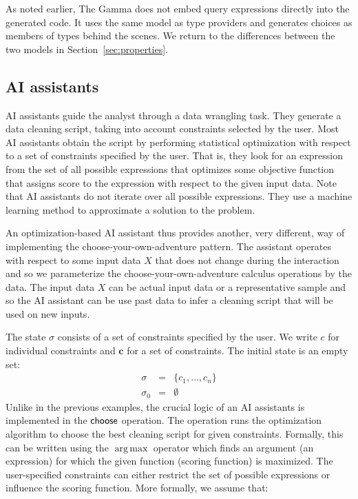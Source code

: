 \documentclass[a4paper,UKenglish,cleveref, autoref, thm-restate]{lipics-v2021}
\newcommand{\ident}[1]{\textsf{#1}}
\newcommand{\sigmaN}{\sigma_0}
\newcommand{\select}{\textnormal{\ident{choose}}}
\DeclareMathOperator{\argmax}{arg\,max}
\begin{document}
As noted earlier, The Gamma does not embed query expressions directly into the generated code.
It uses the same model as type providers and generates choices as members of
types behind the scenes. We return to the differences between the two models in
Section~\ref{sec:properties}.

\subsection{AI assistants}
AI assistants guide the analyst through a data wrangling task. They
generate a data cleaning script, taking into account constraints selected by the user.
Most AI assistants obtain the script by performing statistical optimization with respect
to a set of constraints specified by the user. That is, they look for an expression from the
set of all possible expressions that optimizes some objective function that assigns score to
the expression with respect to the given input data. Note that AI assistants do not iterate
over all possible expressions. They use a machine learning method to approximate a solution
to the problem.

An optimization-based AI assistant \cite{petricek-2023-aias} thus provides another, very
different, way of implementing the choose-your-own-adventure pattern. The assistant operates
with respect to some input data $X$ that does not change during the interaction and so we
parameterize the choose-your-own-adventure calculus operations by the data.
The input data $X$ can be actual input data or a representative sample and so the AI assistant
can be use past data to infer a cleaning script that will be used on new inputs.

The state $\sigma$ consists of a set of constraints specified by the user. We write
$c$ for individual constraints and $\boldsymbol{c}$ for a set of constraints. The initial
state is an empty set:
\[
\begin{array}{rcl}
\sigma &=& \{ c_1, \ldots, c_n \}\\
\sigmaN &=& \emptyset
\end{array}
\]
Unlike in the previous examples, the crucial logic of an AI assistants is implemented in the
$\select$ operation. The operation runs the optimization algorithm to choose the best cleaning
script for given constraints. Formally, this can be written using the $\argmax$ operator which
finds an argument (an expression) for which the given function (scoring function) is maximized.
The user-specified constraints can either restrict the set of possible expressions or influence
the scoring function. More formally, we assume that:
\end{document}
